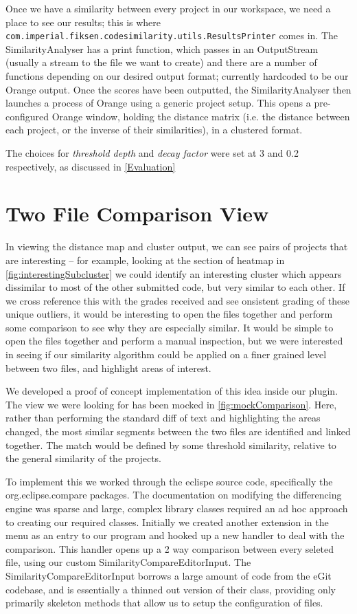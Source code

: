 Once we have a similarity between every project in our workspace, we need a place
to see our results; this is where 
\texttt{com.imperial.fiksen.codesimilarity.utils.ResultsPrinter} comes in.
The SimilarityAnalyser has a print function, which
passes in an OutputStream (usually a stream to the file we want to create) and
there are a number of functions depending on our desired output format; currently
hardcoded to be our Orange output. Once the scores have been outputted, the SimilarityAnalyser
then launches a process of Orange using a generic project setup. This opens a pre-
configured Orange window, holding the distance matrix (i.e. the distance between
each project, or the inverse of their similarities), in a clustered format.

The choices for \emph{threshold depth} and \emph{decay factor} were set at 3 and 0.2
respectively, as discussed in \cref{Evaluation}

\section{Two File Comparison View}
\label{sec:Two File Comparison View}

In viewing the distance map and cluster output, we can see pairs of projects that are
interesting -- for example, looking at the section of heatmap in
\cref{fig:interestingSubcluster} we could identify an interesting cluster which
appears dissimilar to most of the other submitted code, but very similar to
each other. If we cross reference this with the grades received and see
onsistent grading of these unique outliers, it would be interesting to open
the files together and perform some comparison to see why they are especially
similar. It would be simple to open the files together and perform a manual
inspection, but we were interested in seeing if our similarity algorithm could
be applied on a finer grained level between two files, and highlight areas
of interest.

We developed a proof of concept implementation of this idea inside our plugin.
The view we were looking for has been mocked in \cref{fig:mockComparison}. Here,
rather than performing the standard diff of text and highlighting the areas
changed, the most similar segments between the two files are identified and
linked together. The match would be defined by some threshold similarity, relative
to the general similarity of the projects.

To implement this we worked through the eclispe source code, specifically
the org.eclipse.compare packages\cite{eclipseCompare}. The documentation
on modifying the differencing engine was sparse and large, complex library 
classes required an ad hoc approach to creating our required classes.
Initially we created another extension in the menu as an entry to our program
and hooked up a new handler to deal with the comparison. This handler opens
up a 2 way comparison between every seleted file, using our custom 
SimilarityCompareEditorInput. The SimilarityCompareEditorInput borrows 
a large amount of code from the eGit
codebase\cite{egitCompare}, and is essentially a thinned out version of their
class, providing only primarily skeleton methods that allow us to setup the
configuration of files. 

